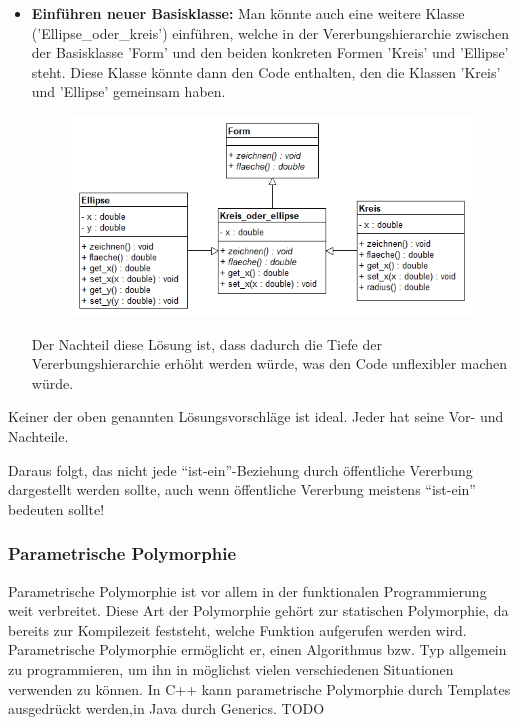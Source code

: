 \begin{itemize}
						\item {\bfseries Einführen neuer Basisklasse:}
							Man könnte auch eine weitere Klasse ('Ellipse\_oder\_kreis') einführen, welche in der Vererbungshierarchie zwischen der
							Basisklasse 'Form' und den beiden konkreten Formen 'Kreis' und 'Ellipse' steht. Diese Klasse
							könnte dann den Code enthalten, den die Klassen 'Kreis' und 'Ellipse' gemeinsam haben.
							\begin{figure}[H]
								\includegraphics[scale=0.6]{polymorphie/universell/vererbung/ellipse-kreis-problem/loesungen/einfuehren_neuer_basisklasse.png}
							\end{figure}
							Der Nachteil diese Lösung ist, dass dadurch die Tiefe der Vererbungshierarchie erhöht werden würde,
							was den Code unflexibler machen würde.
					\end{itemize}
					
					Keiner der oben genannten Lösungsvorschläge ist ideal. Jeder hat seine Vor- und Nachteile.
					
					Daraus folgt, das nicht jede ``ist-ein''-Beziehung durch öffentliche Vererbung dargestellt
					werden sollte, auch wenn öffentliche Vererbung meistens ``ist-ein'' bedeuten sollte!
			
		\subsubsection{Parametrische Polymorphie}
			Parametrische Polymorphie ist vor allem in der funktionalen Programmierung weit verbreitet. Diese Art der
			Polymorphie gehört zur statischen Polymorphie, da bereits zur Kompilezeit feststeht, welche Funktion aufgerufen
			werden wird. Parametrische Polymorphie ermöglicht er, einen Algorithmus bzw. Typ allgemein zu programmieren, um ihn
			in möglichst vielen verschiedenen Situationen verwenden zu können. In C++ kann parametrische Polymorphie durch
			Templates ausgedrückt werden,in Java durch Generics.
			TODO
